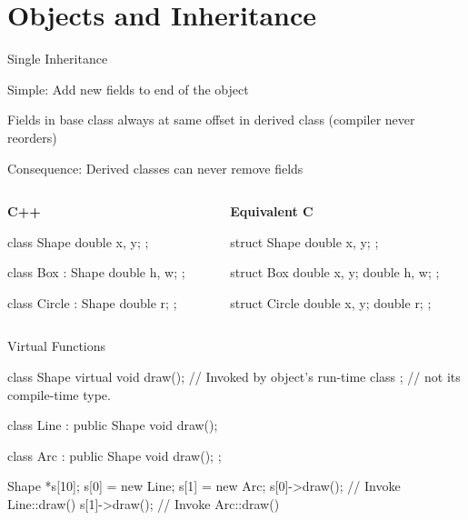\documentclass{plt}
\begin{document}

\part{Objects and Inheritance}
\frame{\partpage}

\begin{frame}[fragile]{Single Inheritance}

Simple: Add new fields to end of the object

Fields in base class always at same offset in derived class (compiler
never reorders)

Consequence: Derived classes can never remove fields

\baselineskip

\begin{columns}
\begin{column}[t]{0.5\textwidth}
\textbf{C++}

\begin{cpp}
class Shape {
  double x, y;
};

class Box : Shape {
  double h, w;
};


class Circle : Shape {
  double r;
};

\end{cpp}
\end{column}
\begin{column}[t]{0.5\textwidth}
\textbf{Equivalent C}

\begin{C}
struct Shape {
  double x, y;
};

struct Box {
  double x, y;
  double h, w;
};

struct Circle {
  double x, y;
  double r;
};
\end{C}
\end{column}
\end{columns}
\end{frame}

\begin{frame}[fragile]{Virtual Functions}

\begin{cpp}
class Shape {
  virtual void draw(); // Invoked by object's run-time class
};                     // not its compile-time type.

class Line : public Shape {
  void draw();
}

class Arc : public Shape {
  void draw();
};

Shape *s[10];
s[0] = new Line;
s[1] = new Arc;
s[0]->draw();   // Invoke Line::draw()
s[1]->draw();   // Invoke Arc::draw()
\end{cpp}

\end{frame}
\end{document}
